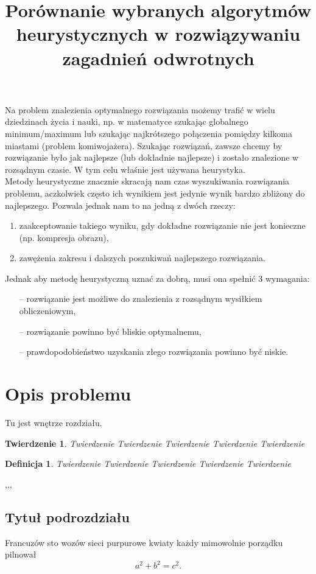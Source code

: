 \documentclass[twoside]{projektInzynierskiMS1}
\title{Porównanie wybranych algorytmów heurystycznych w rozwiązywaniu zagadnień odwrotnych}
\newcommand{\si}{ś}
\newtheorem{twa}{Twierdzenie}%
\newtheorem{dd}{Definicja}%
\begin{document}
Na problem znalezienia optymalnego rozwiązania możemy trafić w wielu dziedzinach życia i nauki, np. w matematyce szukając globalnego minimum/maximum lub szukając najkrótszego połączenia pomiędzy kilkoma miastami (problem komiwojażera). Szukając rozwiązań, zawsze chcemy by rozwiązanie było jak najlepsze (lub dokładnie najlepsze) i zostało znalezione w rozsądnym czasie. W tym celu wła\si nie jest używana heurystyka.\\ 


Metody heurystyczne znacznie skracają nam czas wyszukiwania rozwiązania problemu, aczkolwiek często ich wynikiem jest jedynie wynik bardzo zbliżony do najlepszego. Pozwala jednak nam to na jedną z dwóch rzeczy:
\begin{enumerate}
	\item zaakceptowanie takiego wyniku, gdy dokładne rozwiązanie nie jest konieczne (np. kompresja obrazu),
	\item zawężenia zakresu i dalszych poszukiwań najlepszego rozwiązania. \\
\end{enumerate}
Jednak aby metodę heurystyczną uznać za dobrą, musi ona spełnić 3 wymagania:
\begin{itemize}
	\item[--] rozwiązanie jest możliwe do znalezienia z rozsądnym wysiłkiem obliczeniowym,
	\item[--] rozwiązanie powinno być bliskie optymalnemu,
	\item[--] prawdopodobieństwo uzyskania złego rozwiązania powinno być niskie.
\end{itemize}

\section{Opis problemu}


Tu jest wnętrze rozdziału.

\begin{twa}
Twierdzenie Twierdzenie Twierdzenie Twierdzenie Twierdzenie 
\end{twa}
\begin{dd}
Twierdzenie Twierdzenie Twierdzenie Twierdzenie Twierdzenie 
\end{dd}

\thesection,\thesubsection,\thesubsubsection,

\subsection{Tytuł podrozdziału}
Francuzów sto wozów sieci purpurowe kwiaty każdy mimowolnie porządku pilnował
\begin{equation}
a^2+b^2=c^2.
\end{equation}
\end{document}
